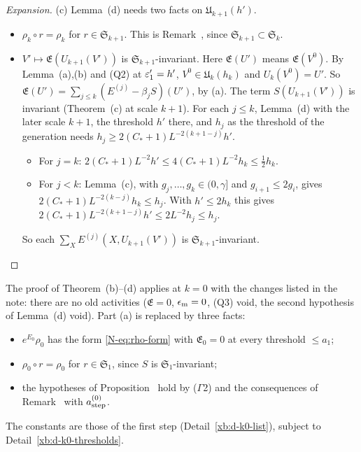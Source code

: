 \begin{proof}[Expansion]
(c) Lemma~(d) needs two facts on $\mathfrak U_{k+1}(h')$.
\begin{itemize}
\item $\rho_k\circ r=\rho_k$ for $r\in\mathfrak S_{k+1}$. This is Remark~, since $\mathfrak S_{k+1}\subset\mathfrak S_k$.
\item $V'\mapsto\mathfrak E(U_{k+1}(V'))$ is $\mathfrak S_{k+1}$-invariant. Here $\mathfrak E(U')$ means $\mathfrak E(V^0)$. By Lemma~(a),(b) and (Q2) at $\varepsilon'_1=h'$, $V^0\in\mathfrak U_k(h_k)$ and $U_k(V^0)=U'$. So $\mathfrak E(U')=\sum_{j\le k}(E^{(j)}-\beta_jS)(U')$, by (a). The term $S(U_{k+1}(V'))$ is invariant (Theorem~(c) at scale $k+1$). For each $j\le k$, Lemma~(d) with the later scale $k+1$, the threshold $h'$ there, and $h_j$ as the threshold of the generation needs $h_j\ge2(C_*+1)L^{-2(k+1-j)}h'$.
\begin{itemize}
\item For $j=k$: $2(C_*+1)L^{-2}h'\le4(C_*+1)L^{-2}h_k\le\frac12h_k$.
\item For $j<k$: Lemma~(c), with $g_j,\dots,g_k\in(0,\gamma]$ and $g_{i+1}\le2g_i$, gives $2(C_*+1)L^{-2(k-j)}h_k\le h_j$. With $h'\le2h_k$ this gives $2(C_*+1)L^{-2(k+1-j)}h'\le2L^{-2}h_j\le h_j$.
\end{itemize}
So each $\sum_XE^{(j)}(X,U_{k+1}(V'))$ is $\mathfrak S_{k+1}$-invariant.
\end{itemize}
\end{proof}

\begin{detail}\label{xb:d-genone}
The proof of Theorem~(b)--(d) applies at $k=0$ with the changes listed in the note: there are no old activities ($\mathfrak E=0$, $\epsilon_{\rm m}=0$, (Q3) void, the second hypothesis of Lemma~(d) void). Part (a) is replaced by three facts:
\begin{itemize}
\item $e^{E_0}\rho_0$ has the form \eqref{N-eq:rho-form} with $\mathfrak E_0=0$ at every threshold $\le a_1$;
\item $\rho_0\circ r=\rho_0$ for $r\in\mathfrak S_1$, since $S$ is $\mathfrak S_1$-invariant;
\item the hypotheses of Proposition~ hold by ($\Gamma$2) and the consequences of Remark~ with $a^{(0)}_{\rm step}$.
\end{itemize}
The constants are those of the first step (Detail~\ref{xb:d-k0-list}), subject to Detail~\ref{xb:d-k0-thresholds}.
\end{detail}


